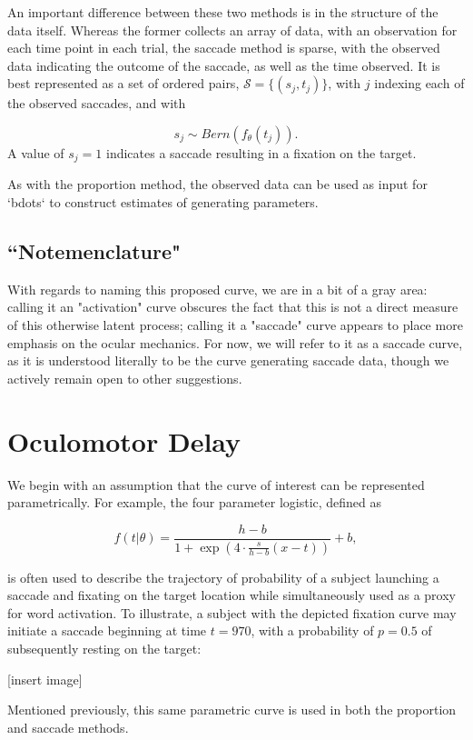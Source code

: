 \documentclass{article}
\begin{document}
An important difference between these two methods is in the structure of the data itself. Whereas the former collects an array of data, with an observation for each time point in each trial, the saccade method is sparse, with the observed data indicating the outcome of the saccade, as well as the time observed. It is best represented as a set of ordered pairs, $\mathcal{S} = \{(s_{j}, t_j)\}$, with $j$ indexing each of the observed saccades, and with

$$
s_{j} \sim Bern(f_{\theta}(t_j)).
$$
A value of $s_j = 1$ indicates a saccade resulting in a fixation on the target. 

As with the proportion method, the observed data can be used as input for `bdots` to construct estimates of generating parameters. 

\subsection{``Notemenclature"}

With regards to naming this proposed curve, we are in a bit of a gray area: calling it an "activation" curve obscures the fact that this is not a direct measure of this otherwise latent process; calling it a "saccade" curve appears to place more emphasis on the ocular mechanics. For now, we will refer to it as a saccade curve, as it is understood literally to be the curve generating saccade data, though we actively remain open to other suggestions.

\section{Oculomotor Delay}


We begin with an assumption that the curve of interest can be represented parametrically. For example, the four parameter logistic, defined as

$$
f(t|\theta) = \frac{h-b}{1 + \exp\left(4 \cdot \frac{s}{h-b}(x - t) \right)} +b,
$$ 

is often used to describe the trajectory of probability of a subject launching a saccade and fixating on the target location while simultaneously used as a proxy for word activation. To illustrate, a subject with the depicted fixation curve may initiate a saccade beginning at time $t = 970$, with a probability of $p = 0.5$ of subsequently resting on the target:

[insert image]


Mentioned previously, this same parametric curve is used in both the proportion and saccade methods.
\end{document}
